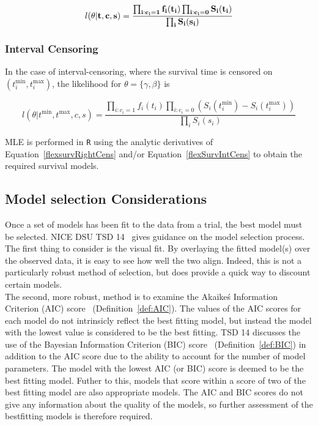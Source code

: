 \begin{equation}
    l(\bf{\theta}|t,c,s) = \frac{\prod_{i:c_i=1} f_i(t_i) \prod_{i:c_i=0} S_i(t_i)}{\prod_{i} S_i(s_i)}
    \label{flexsurvRightCens}
\end{equation}

\subsubsection{Interval Censoring}
In the case of interval-censoring, where the survival time is censored on $(t_i^{\text{min}}, t_i^{\text{max}})$, the likelihood for $\theta = \{\gamma, \beta\}$ is 

\begin{equation}
    \label{flexSurvIntCens}
    l(\theta|t^\text{min}, t^\text{max}, c,s) = \frac{\prod_{i:c_i=1} f_i(t_i) \prod_{i:c_i=0} \left(S_i(t_i^{\text{min}}) - S_i(t_i^{\text{max}}) \right)}{\prod_{i} S_i(s_i)}
\end{equation}

MLE is performed in \verb|R| using the analytic derivatives of Equation~\ref{flexsurvRightCens} and/or Equation~\ref{flexSurvIntCens} to obtain the required survival models. 

\subsection{Model selection Considerations}
Once a set of models has been fit to the data from a trial, the best model must be selected. NICE DSU TSD 14~\cite{tsd14} gives guidance on the model selection process. \\

The first thing to consider is the visual fit. By overlaying the fitted model(s) over the observed data, it is easy to see how well the two align. Indeed, this is not a particularly robust method of selection, but does provide a quick way to discount certain models. \\

The second, more robust, method is to examine the Akaike\'s Information Criterion (AIC) score~\cite{akaike} (Definition~\ref{def:AIC}). The values of the AIC scores for each model do not intrinsicly reflect the best fitting model, but instead the model with the lowest value is considered to be the best fitting. TSD 14 discusses the use of the Bayesian Information Criterion (BIC) score~\cite{schwarz} (Definition~\ref{def:BIC}) in addition to the AIC score due to the ability to account for the number of model parameters. The model with the lowest AIC (or BIC) score is deemed to be the best fitting model. Futher to this, models that score within a score of two of the best fitting model are also appropriate models. The AIC and BIC scores do not give any information about the quality of the models, so further assessment of the best\-fitting models is therefore required.

